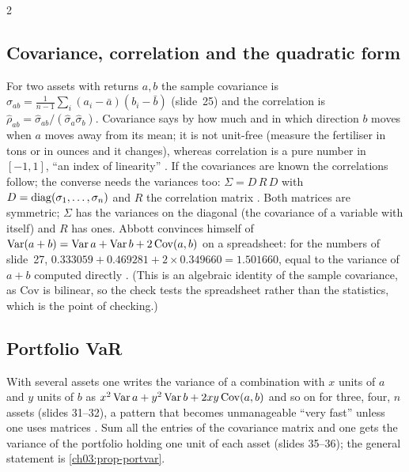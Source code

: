 \begin{paracol}{2}
\subsection{Covariance, correlation and the quadratic form}
For two assets with returns $a,b$ the sample covariance is $\hat\sigma_{ab}=\frac1{n-1}\sum_i(a_i-\bar a)(b_i-\bar b)$ (slide~25) and the correlation is $\hat\rho_{ab}=\hat\sigma_{ab}/(\hat\sigma_a\hat\sigma_b)$. Covariance says by how much and in which direction $b$ moves when $a$ moves away from its mean; it is not unit-free (measure the fertiliser in tons or in ounces and it changes), whereas correlation is a pure number in $[-1,1]$, ``an index of linearity'' . If the covariances are known the correlations follow; the converse needs the variances too: $\Sigma=D\,R\,D$ with $D=\operatorname{diag}(\sigma_1,\dots,\sigma_n)$ and $R$ the correlation matrix . Both matrices are symmetric; $\Sigma$ has the variances on the diagonal (the covariance of a variable with itself) and $R$ has ones. Abbott convinces himself of $\operatorname{Var}(a+b)=\operatorname{Var} a+\operatorname{Var} b+2\operatorname{Cov}(a,b)$ on a spreadsheet: for the numbers of slide~27, $0.333059+0.469281+2\times0.349660=1.501660$, equal to the variance of $a+b$ computed directly . (This is an algebraic identity of the sample covariance, as $\mathrm{Cov}$ is bilinear, so the check tests the spreadsheet rather than the statistics, which is the point of checking.)

\subsection{Portfolio VaR}
With several assets one writes the variance of a combination with $x$ units of $a$ and $y$ units of $b$ as $x^2\operatorname{Var} a+y^2\operatorname{Var} b+2xy\operatorname{Cov}(a,b)$ and so on for three, four, $n$ assets (slides 31--32), a pattern that becomes unmanageable ``very fast'' unless one uses matrices . Sum all the entries of the covariance matrix and one gets the variance of the portfolio holding one unit of each asset (slides 35--36); the general statement is \cref{ch03:prop-portvar}.


\end{paracol}
